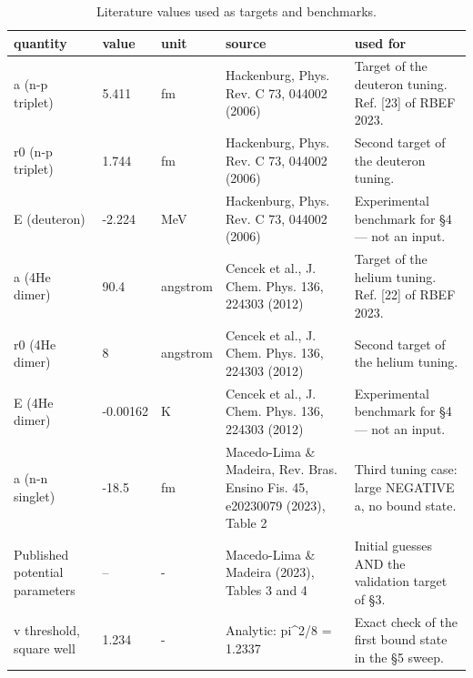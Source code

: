 \begin{table}[htbp]
\centering
\small
\caption{Literature values used as targets and benchmarks.}
\label{tab:literature}
\begin{tabular}{lllll}
\hline
quantity & value & unit & source & used for \\
\hline
a (n-p triplet) & 5.411 & fm & Hackenburg, Phys. Rev. C 73, 044002 (2006) & Target of the deuteron tuning. Ref. [23] of RBEF 2023.\\
r0 (n-p triplet) & 1.744 & fm & Hackenburg, Phys. Rev. C 73, 044002 (2006) & Second target of the deuteron tuning.\\
E (deuteron) & -2.224 & MeV & Hackenburg, Phys. Rev. C 73, 044002 (2006) & Experimental benchmark for §4 — not an input.\\
a (4He dimer) & 90.4 & angstrom & Cencek et al., J. Chem. Phys. 136, 224303 (2012) & Target of the helium tuning. Ref. [22] of RBEF 2023.\\
r0 (4He dimer) & 8 & angstrom & Cencek et al., J. Chem. Phys. 136, 224303 (2012) & Second target of the helium tuning.\\
E (4He dimer) & -0.00162 & K & Cencek et al., J. Chem. Phys. 136, 224303 (2012) & Experimental benchmark for §4 — not an input.\\
a (n-n singlet) & -18.5 & fm & Macedo-Lima \& Madeira, Rev. Bras. Ensino Fis. 45, e20230079 (2023), Table 2 & Third tuning case: large NEGATIVE a, no bound state.\\
Published potential parameters & -- & - & Macedo-Lima \& Madeira (2023), Tables 3 and 4 & Initial guesses AND the validation target of §3.\\
v threshold, square well & 1.234 & - & Analytic: pi\textasciicircum{}2/8 = 1.2337 & Exact check of the first bound state in the §5 sweep. \\
\hline
\end{tabular}
\end{table}
